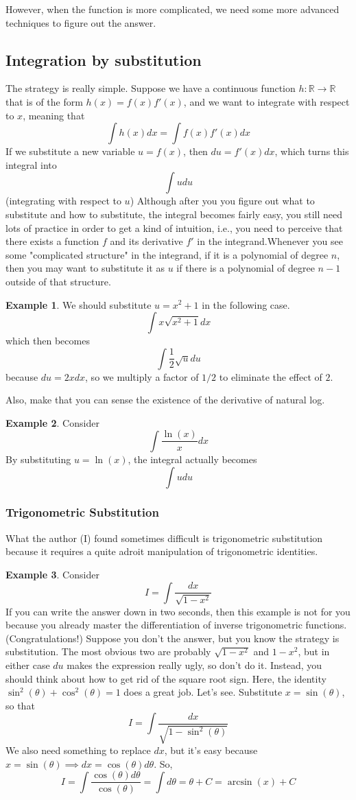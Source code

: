 \documentclass{article}
\theoremstyle{definition}
\theoremstyle{definition}
\theoremstyle{definition}
\theoremstyle{definition}
\theoremstyle{definition}
\theoremstyle{definition}
\newtheorem{example}{Example}
\theoremstyle{definition}
\theoremstyle{definition}
\theoremstyle{definition}
\begin{document}
However, when the function is more complicated, we need some more advanced techniques to figure out the answer.

\subsection{Integration by substitution}
The strategy is really simple. Suppose we have a continuous function $h:\mathbb{R}\to\mathbb{R}$ that is of the form $h(x)=f(x)f'(x)$, and we want to integrate with respect to $x$, meaning that
\[
\int h(x)dx=\int f(x)f'(x)dx
\]
If we substitute a new variable $u=f(x)$, then $du=f'(x)dx$, which turns this integral into
\[
\int udu
\]
(integrating with respect to $u$) Although after you you figure out what to substitute and how to substitute, the integral becomes fairly easy, you still need lots of practice in order to get a kind of intuition, i.e., you need to perceive that there exists a function $f$ and its derivative $f'$ in the integrand.Whenever you see some "complicated structure" in the integrand, if it is a polynomial of degree $n$, then you may want to substitute it as $u$ if there is a polynomial of degree $n-1$ outside of that structure. 
\begin{example}
We should substitute $u=x^2+1$ in the following case.
\[
\int x\sqrt{x^2+1}dx
\]
which then becomes
\[
\int \dfrac{1}{2}\sqrt{u}du
\]
because $du=2xdx$, so we multiply a factor of $1/2$ to eliminate the effect of $2$.
\end{example}

Also, make that you can sense the existence of the derivative of natural log.
\begin{example}
Consider \[\int\dfrac{\ln(x)}{x}dx\] By substituting $u=\ln(x)$, the integral actually becomes \[\int udu\]
\end{example}

\subsubsection{Trigonometric Substitution}
What the author (I) found sometimes difficult is trigonometric substitution because it requires a quite adroit manipulation of trigonometric identities.
\begin{example}
Consider \[I=\int\dfrac{dx}{\sqrt{1-x^2}}\] If you can write the answer down in two seconds, then this example is not for you because you already master the differentiation of inverse trigonometric functions. (Congratulations!) Suppose you don't the answer, but you know the strategy is substitution. The most obvious two are probably $\sqrt{1-x^2}$ and $1-x^2$, but in either case $du$ makes the expression really ugly, so don't do it. Instead, you should think about how to get rid of the square root sign. Here, the identity $\sin^2(\theta)+\cos^2(\theta)=1$ does a great job. Let's see. Substitute $x=\sin(\theta)$, so that 
\[
I=\int\dfrac{dx}{\sqrt{1-\sin^2(\theta)}}
\]
We also need something to replace $dx$, but it's easy because $x=\sin(\theta)\implies dx=\cos(\theta)d\theta$. So,
\[
I=\int\dfrac{\cos(\theta)d\theta}{\cos(\theta)}=\int d\theta=\theta+C=\arcsin(x)+C
\]
\end{example}
\end{document}
